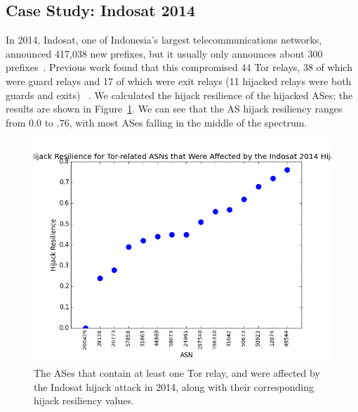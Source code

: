 \subsection{Case Study: Indosat 2014}
In 2014, Indosat, one of Indonesia's largest telecommunications networks, announced 417,038 new prefixes, but it usually only announces about 300 prefixes~\cite{indosat2014}.  Previous work found that this compromised 44 Tor relays, 38 of which were guard relays and 17 of which were exit relays (11 hijacked relays were both guards and exits) ~\cite{sun2015raptor}.  We calculated the hijack resilience of the hijacked ASes; the results are shown in Figure~\ref{fig:case_study}.  We can see that the AS hijack resiliency ranges from 0.0 to .76, with most ASes falling in the middle of the spectrum. 

\begin{figure}
\centering
\includegraphics[width=.4\textwidth]{case_study_graph}
\caption{The ASes that contain at least one Tor relay, and were affected by the Indosat hijack attack in 2014, along with their corresponding hijack resiliency values.}
\label{fig:case_study}
\end{figure}
